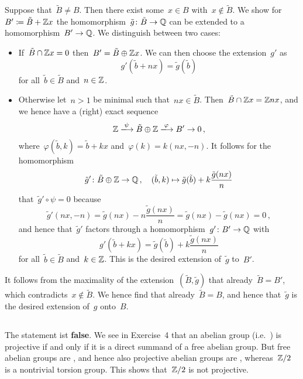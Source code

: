 Suppose that~$\tilde{B} \neq B$.
Then there exist some~$x \in B$ with~$x \notin \tilde{B}$.
We show for~$B' \coloneqq \tilde{B} + \mathbb{Z} x$ the homomorphism~$\tilde{g} \colon \tilde{B} \to \mathbb{Q}$ can be extended to a homomorphism~$B' \to \mathbb{Q}$.
We distinguish between two cases:
\begin{itemize}
  \item
    If~$\tilde{B} \cap \mathbb{Z} x = 0$ then~$B' = \tilde{B} \oplus \mathbb{Z} x$.
    We can then choose the extension~$g'$ as
    \[
        g'(\tilde{b} + nx)
      = \tilde{g}(\tilde{b})
    \]
    for all~$\tilde{b} \in \tilde{B}$ and~$n \in \mathbb{Z}$.
  \item
    Otherwise let~$n > 1$ be minimal such that~$nx \in \tilde{B}$.
    Then~$\tilde{B} \cap \mathbb{Z} x = \mathbb{Z} nx$, and we hence have a (right) exact sequence
    \[
      \Integer
      \xlongto{\psi}
      \tilde{B} \oplus \Integer
      \xlongto{\varphi}
      B'
      \to
      0 \,,
    \]
    where~$\varphi(\tilde{b},k) = \tilde{b}+kx$ and~$\varphi(k) = k(nx,-n)$.
    It follows for the homomorphism
    \[
      \tilde{g}'
      \colon
      \tilde{B} \oplus \mathbb{Z}
      \to
      \mathbb{Q} \,,
      \quad
      (\tilde{b},k)
      \mapsto
      \tilde{g}(\tilde{b}) + k \frac{\tilde{g}(nx)}{n}
    \]
    that~$\tilde{g}' \circ \psi = 0$ because
    \[
      \tilde{g}'(nx,-n)
      =
      \tilde{g}(nx) - n \frac{\tilde{g}(nx)}{n}
      =
      \tilde{g}(nx) - \tilde{g}(nx)
      =
      0 \,,
    \]
    and hence that~$\tilde{g}'$ factors through a homomorphism~$g' \colon B' \to \mathbb{Q}$ with
    \[
      g'(\tilde{b} + kx)
      =
      \tilde{g}(\tilde{b}) + k \frac{\tilde{g}(nx)}{n}
    \]
    for all~$\tilde{b} \in \tilde{B}$ and~$k \in \mathbb{Z}$.
    This is the desired extension of~$\tilde{g}$ to~$B'$.
\end{itemize}

It follows from the maximality of the extension~$(\tilde{B}, \tilde{g})$ that already~$\tilde{B} = B'$, which contradicts~$x \notin \tilde{B}$.
We hence find that already~$\tilde{B} = B$, and hence that~$\tilde{g}$ is the desired extension of~$g$ onto~$B$.





\subsection{}

The statement ist \textbf{false}.
We see in Exercise~4 that an abelian group (i.e.~{\module{$\Integer$}}) is projective if and only if it is a direct summand of a free abelian group.
But free abelian groups are , and hence also projective abelian groups are , whereas~$\mathbb{Z}/2$ is a nontrivial torsion group.
This shows that~$\mathbb{Z}/2$ is not projective.
